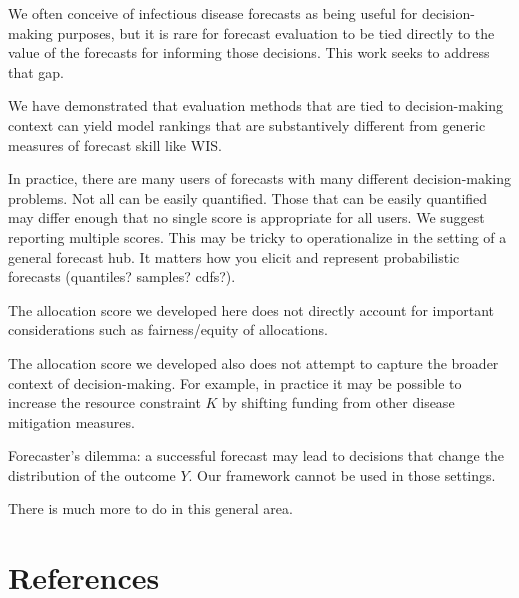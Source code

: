 \documentclass{article}
\begin{document}
We often conceive of infectious disease forecasts as being useful for decision-making purposes, but it is rare for forecast evaluation to be tied directly to the value of the forecasts for informing those decisions. This work seeks to address that gap.

We have demonstrated that evaluation methods that are tied to decision-making context can yield model rankings that are substantively different from generic measures of forecast skill like WIS.

In practice, there are many users of forecasts with many different decision-making problems. Not all can be easily quantified. Those that can be easily quantified may differ enough that no single score is appropriate for all users. We suggest reporting multiple scores. This may be tricky to operationalize in the setting of a general forecast hub. It matters how you elicit and represent probabilistic forecasts (quantiles? samples? cdfs?).

The allocation score we developed here does not directly account for important considerations such as fairness/equity of allocations.

The allocation score we developed also does not attempt to capture the broader context of decision-making. For example, in practice it may be possible to increase the resource constraint $K$ by shifting funding from other disease mitigation measures.

Forecaster's dilemma: a successful forecast may lead to decisions that change the distribution of the outcome $Y$. Our framework cannot be used in those settings.

There is much more to do in this general area.

\section{References}

\printbibliography
\end{document}
